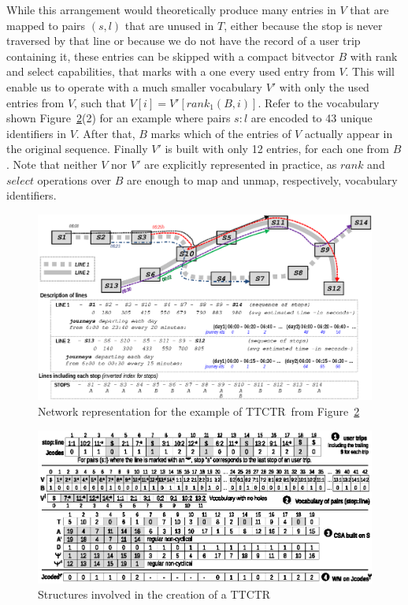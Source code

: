 \documentclass[runningheads]{llncs}
\newcommand{\ttctr}{TTCTR}
\begin{document}
While this arrangement would theoretically produce many entries in $V$ that are mapped to pairs $(s,l)$ that are unused in $T$, either because the stop is never traversed by that line or because we do not have the record of a user trip containing it, these entries can be skipped with a compact bitvector $B$ with rank and select capabilities, that marks with a one every used entry from $V$. This will enable us to operate with a much smaller vocabulary $V'$ with only the used entries from $V$, such that $V[i] = V'[rank_1(B,i)]$. Refer to the vocabulary shown Figure~\ref{fig:ttctr}(2) for an example where pairs $s:l$ are encoded to 43 unique identifiers in $V$. After that, $B$ marks which of the entries of $V$ actually appear in the original sequence. Finally $V'$ is built with only 12 entries, for each one from $B$. Note that neither $V$ nor $V'$ are explicitly represented in practice, as $rank$ and $select$ operations over $B$ are enough to map and unmap, respectively, vocabulary identifiers.

\begin{figure}
\includegraphics[width=\textwidth]{network.eps}
\caption{Network representation for the example of \ttctr~from Figure~\ref{fig:ttctr}}
\label{fig:example_trips_ttctr}
\end{figure}

\begin{figure}
    \includegraphics[width=1.00\textwidth]{ttctr2019.eps}
	\caption{Structures involved in the creation of a \ttctr}
	\label{fig:ttctr}
\end{figure}
\end{document}
